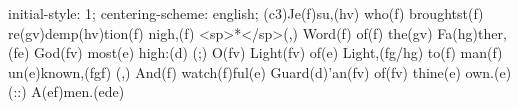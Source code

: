 initial-style: 1;
centering-scheme: english;
(c3)Je(f)su,(hv) who(f) broughtst(f) re(gv)demp(hv)tion(f) nigh,(f) <sp>*</sp>(,)
Word(f) of(f) the(gv) Fa(hg)ther,(fe) God(fv) most(e) high:(d) (;)
O(fv) Light(fv) of(e) Light,(fg/hg) to(f) man(f) un(e)known,(fgf) (,)
And(f) watch(f)ful(e) Guard(d)'an(fv) of(fv) thine(e) own.(e) (::)
A(ef)men.(ede)
